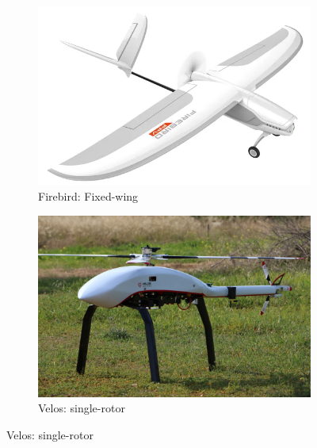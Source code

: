 \begin{figure}[htb!]
  \centering
  \begin{subfigure}[t]{0.35\textwidth}
  \includegraphics[width=1.0\textwidth]{./img/png/uav-FirebirdFPV-FixedWing.png}
  \caption{Firebird: Fixed-wing~\cite{firebirdDrone}}%
  \label{fig:uav-fixed-wing}
  \end{subfigure}
%
  \begin{subfigure}[t]{0.35\textwidth}
  \includegraphics[width=1.0\textwidth]{./img/jpg/uav-velos-singleRotor.jpg}
  \caption{Velos: single-rotor~\cite{velosDrone}}%
  \label{fig:uav-single-rotor}
\end{subfigure}


\end{figure}
